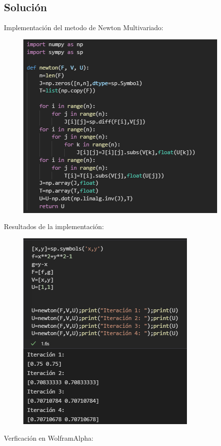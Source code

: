 \documentclass[10pt,letterpaper]{article}
\begin{document}
	\subsection{Solución}
	Implementación del metodo de Newton Multivariado:\\
	\begin{figure}[H]
		\includegraphics{imagen6}
		\centering
	\end{figure}
	Resultados de la implementación:\\
	\begin{figure}[H]
		\includegraphics{imagen7}
		\centering
	\end{figure}
	Verficación en WolframAlpha:\\
\end{document}

